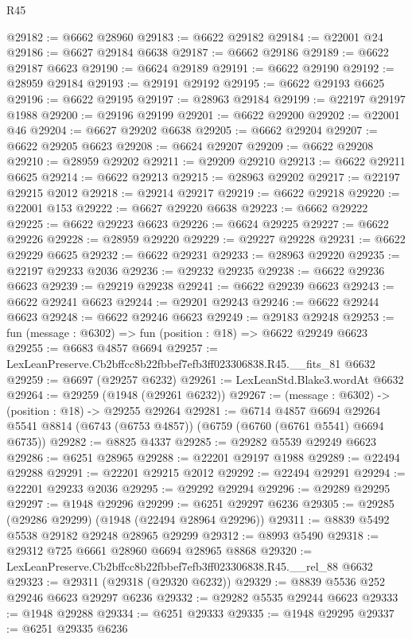 \begin{lexlean}{R45}
\begin{coremodule}
{@29182 := @6662 @28960
@29183 := @6622 @29182
@29184 := @22001 @24
@29186 := @6627 @29184 @6638
@29187 := @6662 @29186
@29189 := @6622 @29187 @6623
@29190 := @6624 @29189
@29191 := @6622 @29190
@29192 := @28959 @29184
@29193 := @29191 @29192
@29195 := @6622 @29193 @6625
@29196 := @6622 @29195
@29197 := @28963 @29184
@29199 := @22197 @29197 @1988
@29200 := @29196 @29199
@29201 := @6622 @29200
@29202 := @22001 @46
@29204 := @6627 @29202 @6638
@29205 := @6662 @29204
@29207 := @6622 @29205 @6623
@29208 := @6624 @29207
@29209 := @6622 @29208
@29210 := @28959 @29202
@29211 := @29209 @29210
@29213 := @6622 @29211 @6625
@29214 := @6622 @29213
@29215 := @28963 @29202
@29217 := @22197 @29215 @2012
@29218 := @29214 @29217
@29219 := @6622 @29218
@29220 := @22001 @153
@29222 := @6627 @29220 @6638
@29223 := @6662 @29222
@29225 := @6622 @29223 @6623
@29226 := @6624 @29225
@29227 := @6622 @29226
@29228 := @28959 @29220
@29229 := @29227 @29228
@29231 := @6622 @29229 @6625
@29232 := @6622 @29231
@29233 := @28963 @29220
@29235 := @22197 @29233 @2036
@29236 := @29232 @29235
@29238 := @6622 @29236 @6623
@29239 := @29219 @29238
@29241 := @6622 @29239 @6623
@29243 := @6622 @29241 @6623
@29244 := @29201 @29243
@29246 := @6622 @29244 @6623
@29248 := @6622 @29246 @6623
@29249 := @29183 @29248
@29253 := fun (message : @6302) => fun (position : @18) => @6622 @29249 @6623
@29255 := @6683 @4857 @6694
@29257 := LexLeanPreserve.Cb2bffcc8b22fbbef7efb3ff023306838.R45.__fits_81 @6632
@29259 := @6697 (@29257 @6232)
@29261 := LexLeanStd.Blake3.wordAt @6632
@29264 := @29259 (@1948 (@29261 @6232))
@29267 := (message : @6302) -> (position : @18) -> @29255 @29264
@29281 := @6714
    @4857
    @6694
    @29264
    @5541
    @8814
    (@6743 (@6753 @4857))
    (@6759 (@6760 (@6761 @5541) @6694 @6735))
@29282 := @8825 @4337
@29285 := @29282 @5539 @29249 @6623
@29286 := @6251 @28965
@29288 := @22201 @29197 @1988
@29289 := @22494 @29288
@29291 := @22201 @29215 @2012
@29292 := @22494 @29291
@29294 := @22201 @29233 @2036
@29295 := @29292 @29294
@29296 := @29289 @29295
@29297 := @1948 @29296
@29299 := @6251 @29297 @6236
@29305 := @29285 (@29286 @29299) (@1948 (@22494 @28964 @29296))
@29311 := @8839 @5492 @5538 @29182 @29248 @28965 @29299
@29312 := @8993 @5490
@29318 := @29312 @725 @6661 @28960 @6694 @28965 @8868
@29320 := LexLeanPreserve.Cb2bffcc8b22fbbef7efb3ff023306838.R45.__rel_88 @6632
@29323 := @29311 (@29318 (@29320 @6232))
@29329 := @8839 @5536 @252 @29246 @6623 @29297 @6236
@29332 := @29282 @5535 @29244 @6623
@29333 := @1948 @29288
@29334 := @6251 @29333
@29335 := @1948 @29295
@29337 := @6251 @29335 @6236
}
\end{coremodule}
\end{lexlean}

